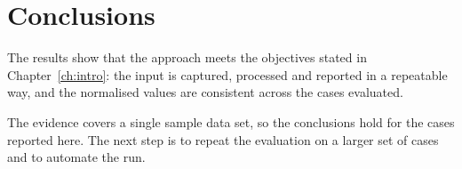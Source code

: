 \chapter{Conclusions}
\label{ch:conclusions}

The results show that the approach meets the objectives stated in
Chapter~\ref{ch:intro}: the input is captured, processed and reported in a
repeatable way, and the normalised values are consistent across the cases
evaluated.

The evidence covers a single sample data set, so the conclusions hold for
the cases reported here. The next step is to repeat the evaluation on a
larger set of cases and to automate the run.

